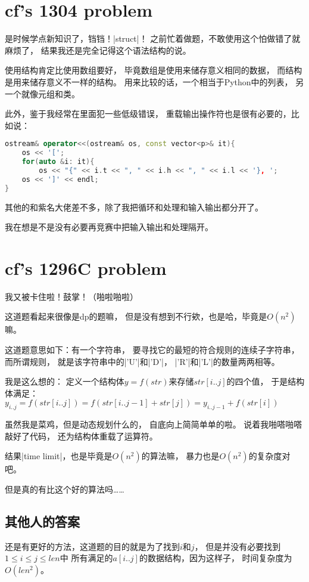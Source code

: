 
\section{cf's 1304 problem}

是时候学点新知识了，铛铛！\vb|struct|！
之前忙着做题，不敢使用这个怕做错了就麻烦了，
结果我还是完全记得这个语法结构的说。

使用结构肯定比使用数组要好，
毕竟数组是使用来储存意义相同的数据，
而结构是用来储存意义不一样的结构。
用来比较的话，一个相当于Python中的列表，
另一个就像元组和类。

此外，鉴于我经常在里面犯一些低级错误，
重载输出操作符也是很有必要的，比如说：
\begin{lstlisting}[language=C++]
ostream& operator<<(ostream& os, const vector<p>& it){
    os << '[';
    for(auto &i: it){
        os << "{" << i.t << ", " << i.h << ", " << i.l << '}, ';
    os << ']' << endl;
}
\end{lstlisting}

其他的和紫名大佬差不多，除了我把循环和处理和输入输出都分开了。

我在想是不是没有必要再竞赛中把输入输出和处理隔开。


\section{cf's 1296C problem}

我又被卡住啦！鼓掌！（啪啦啪啦）

这道题看起来很像是dp的题嘛，
但是没有想到不行欸，也是哈，毕竟是$O(n^2)$嘛。

这道题意思如下：有一个字符串，
要寻找它的最短的符合规则的连续子字符串，
而所谓规则，
就是该字符串中的\vb|'U'|和\vb|'D'|，
\vb|'R'|和\vb|'L'|的数量两两相等。

我是这么想的：
定义一个结构体$y = f(str)$来存储$str[i..j]$的四个值，
于是结构体满足：
$y_{i..j}=f(str[i..j])=f(str[i..j-1]+str[j])=
y_{i..j-1}+f(str[i])$

虽然我是菜鸡，但是动态规划什么的，
自底向上简简单单的啦。
说着我啪嗒啪嗒敲好了代码，
还为结构体重载了运算符。

结果\vb|time limit|，也是毕竟是$O(n^2)$的算法嘛，
暴力也是$O(n^2)$的复杂度对吧。

但是真的有比这个好的算法吗\ldots\ldots

\subsection{其他人的答案}
还是有更好的方法，这道题的目的就是为了找到$i$和$j$，
但是并没有必要找到$1\le i\le j\le len$中%
所有满足的$a[i..j]$的数据结构，因为这样子，
时间复杂度为$O(len^2)$。


